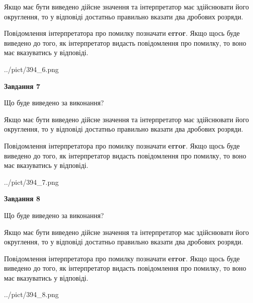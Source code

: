 \documentclass[12pt, ukrainian]{article}
\begin{document}
{\begin {Large}
Якщо має бути виведено дійсне значення та інтерпретатор має здійснювати його округлення, 
то у відповіді достатньо правильно вказати два дробових розряди.

Повідомлення інтерпретатора про помилку позначати \textbf{error}.
Якщо щось буде виведено до того, як інтерпретатор видасть повідомлення про помилку, 
то воно має вказуватись у відповіді. \par

\begin{center}
	{../pict/394_6.png}
\end{center}
\newpage

{\begin {center}\textbf{Завдання 7}\end {center}}\par
Що буде виведено за виконання? \par

Якщо має бути виведено дійсне значення та інтерпретатор має здійснювати його округлення, 
то у відповіді достатньо правильно вказати два дробових розряди.

Повідомлення інтерпретатора про помилку позначати \textbf{error}.
Якщо щось буде виведено до того, як інтерпретатор видасть повідомлення про помилку, 
то воно має вказуватись у відповіді. \par

\begin{center}
	{../pict/394_7.png}
\end{center}
\newpage

{\begin {center}\textbf{Завдання 8}\end {center}}\par
Що буде виведено за виконання? \par

Якщо має бути виведено дійсне значення та інтерпретатор має здійснювати його округлення, 
то у відповіді достатньо правильно вказати два дробових розряди.

Повідомлення інтерпретатора про помилку позначати \textbf{error}.
Якщо щось буде виведено до того, як інтерпретатор видасть повідомлення про помилку, 
то воно має вказуватись у відповіді. \par

\begin{center}
	{../pict/394_8.png}
\end{center}
\newpage


\end{Large}}
\end{document}
